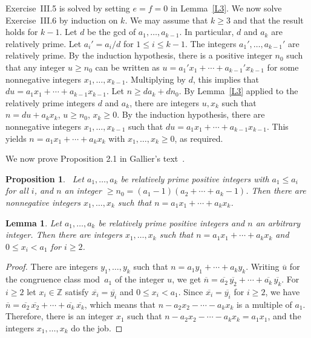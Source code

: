 \documentclass[12pt,letterpaper]{article}
\newtheorem{lem}[thm]{Lemma} %
\newtheorem{prop}[thm]{Proposition}
\begin{document}
Exercise~III.5 is solved by setting $e=f=0$ in Lemma~\ref{L3}. We now solve Exercise~III.6 by induction on $k$. We may assume that $k\ge3$ and that the result holds for $k-1$. Let $d$ be the gcd of $a_1,\ldots,a_{k-1}$. In particular, $d$ and $a_k$ are relatively prime. Let $a_i' = a_i/d$ for $1 \le i \le k-1$. The integers $a_1', \ldots, a_{k-1}'$ are relatively prime. By the induction hypothesis, there is a positive integer $n_0$ such that any integer $u \ge n_0$ can be written as $u = a_1' x_1 + \cdots + a_{k-1}' x_{k-1}$ for some nonnegative integers $x_1,\ldots,x_{k-1}$. Multiplying by $d$, this implies that $du = a_1 x_1 + \cdots + a_{k-1} x_{k-1}$. Let $n \ge da_k+dn_0$. By Lemma~\ref{L3} applied to the relatively prime integers $d$ and $a_k$, there are integers $u,x_k$ such that $n=du+a_kx_k$, $u\ge n_0$, $x_k\ge0$. By the induction hypothesis, there are nonnegative integers $x_1,\ldots,x_{k-1}$ such that $du=a_1x_1+\cdots+a_{k-1}x_{k-1}$. This yields $n=a_1x_1+\cdots+a_kx_k$ with $x_1,\ldots,x_k\ge0$, as required. 

We now prove Proposition 2.1 in Gallier's text~\cite{gallier}. 

\begin{prop}~\label{PG}
Let $a_1,\ldots,a_k$ be relatively prime positive integers with $a_1\le a_i$ for all $i$, and $n$ an integer $\ge n_0=(a_1-1)(a_2+\cdots+a_k-1)$. Then there are nonnegative integers $x_1,\ldots,x_k$ such that $n=a_1x_1+\cdots+a_kx_k$.
\end{prop} 

\begin{lem}\label{L5}
Let $a_1,\ldots,a_k$ be relatively prime positive integers and $n$ an arbitrary integer. Then there are integers $x_1,\ldots,x_k$ such that $n=a_1x_1+\cdots+a_kx_k$ and $0\le x_i<a_1$ for $i\ge2$.  
\end{lem} 

\begin{proof}
There are integers $y_1,\ldots,y_k$ such that $n=a_1y_1+\cdots+a_ky_k$. Writing $\overline{u}$ for the congruence class mod~$a_1$ of the integer $u$, we get $\overline{n}=\overline{a_2}\,\overline{y_2}+\cdots+\overline{a_k}\,\overline{y_k}$. For $i\ge2$ let $x_i\in\mathbb Z$ satisfy $\overline{x_i}=\overline{y_i}$ and $0\le x_i<a_1$. Since $\overline{x_i} = \overline{y_i}$ for $i \ge 2$, we have $\overline{n} = \overline{a_2}\,\overline{x_2}+\cdots+\overline{a_k}\,\overline{x_k}$, which means that $n - a_2x_2 - \cdots - a_kx_k$ is a multiple of $a_1$. Therefore, there is an integer $x_1$ such that $n - a_2x_2 - \cdots - a_kx_k = a_1x_1$, and the integers $x_1,\ldots,x_k$ do the job.
\end{proof} 
\end{document}
